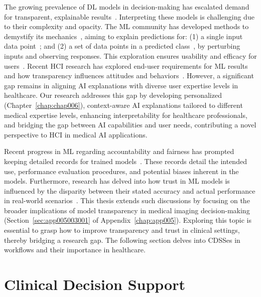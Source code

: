 \textcolor{revised}{The growing prevalence of \ac{DL} models in decision-making has escalated demand for transparent, explainable results~\cite{10.5555/3305381.3305576}.
Interpreting these models is challenging due to their complexity and opacity. The \ac{ML} community has developed methods to demystify its mechanics~\cite{10.1145/2939672.2939778, pmlr-v80-kim18d}, aiming to explain predictions for:
(1) a single input data point~\cite{10.1145/2939672.2939778}; and
(2) a set of data points in a predicted class~\cite{pmlr-v80-kim18d}, by perturbing inputs and observing responses.
This exploration ensures usability and efficacy for users~\cite{10.1145/3173574.3174156}.
Recent \ac{HCI} research has explored end-user requirements for \ac{ML} results and how transparency influences attitudes and behaviors~\cite{10.1145/3313831.3376301}.
However, a significant gap remains in aligning \ac{AI} explanations with diverse user expertise levels in healthcare.
Our research addresses this gap by developing personalized (Chapter~\ref{chap:chap006}), context-aware \ac{AI} explanations tailored to different medical expertise levels, enhancing interpretability for healthcare professionals, and bridging the gap between \ac{AI} capabilities and user needs, contributing a novel perspective to \ac{HCI} in medical \ac{AI} applications.}

\textcolor{revised}{Recent progress in \ac{ML} regarding accountability and fairness has prompted keeping detailed records for trained models~\cite{10.1145/3351095.3375709, 10.1145/3287560.3287596}.
These records detail the intended use, performance evaluation procedures, and potential biases inherent in the models.
Furthermore, research has delved into how trust in \ac{ML} models is influenced by the disparity between their stated accuracy and actual performance in real-world scenarios~\cite{10.1145/3290605.3300509}.
This thesis extends such discussions by focusing on the broader implications of model transparency in medical imaging decision-making (Section~\ref{sec:app005003001} of Appendix~\ref{chap:app005}).
Exploring this topic is essential to grasp how to improve transparency and trust in clinical settings, thereby bridging a research gap.
The following section delves into \acp{CDSSe} in workflows and their importance in healthcare.}

\section{Clinical Decision Support}
\label{sec:chap003003}

